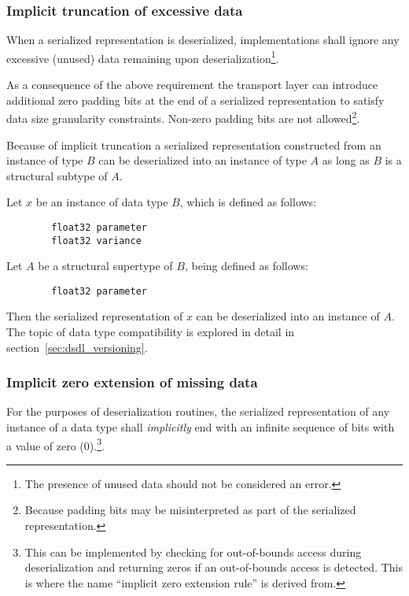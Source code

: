 \subsubsection{Implicit truncation of excessive data}

When a serialized representation is deserialized, implementations shall ignore
any excessive (unused) data remaining upon deserialization\footnote{%
    The presence of unused data should not be considered an error.
}.

As a consequence of the above requirement the transport layer can introduce
additional zero padding bits at the end of a serialized representation
to satisfy data size granularity constraints.
Non-zero padding bits are not allowed\footnote{%
    Because padding bits may be misinterpreted as part of the serialized representation.
}.

\begin{remark}
    Because of implicit truncation a serialized representation constructed from an instance of type $B$ can be
    deserialized into an instance of type $A$ as long as $B$ is a structural subtype of $A$.

    Let $x$ be an instance of data type $B$, which is defined as follows:

    \begin{verbatim}
        float32 parameter
        float32 variance
    \end{verbatim}

    Let $A$ be a structural supertype of $B$, being defined as follows:

    \begin{verbatim}
        float32 parameter
    \end{verbatim}

    Then the serialized representation of $x$ can be deserialized into an instance of $A$.
    The topic of data type compatibility is explored in detail in section~\ref{sec:dsdl_versioning}.
\end{remark}

\subsubsection{Implicit zero extension of missing data}

For the purposes of deserialization routines,
the serialized representation of any instance of a data type shall \emph{implicitly} end with an
infinite sequence of bits with a value of zero (0).\footnote{%
    This can be implemented by checking for out-of-bounds access during deserialization and returning zeros
    if an out-of-bounds access is detected. This is where the name ``implicit zero extension rule'' is derived
    from.
}.

